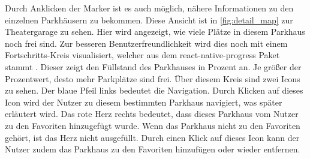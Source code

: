 Durch Anklicken der Marker ist es auch möglich, nähere Informationen zu den einzelnen Parkhäusern zu bekommen. Diese Ansicht ist in \autoref{fig:detail_map} zur Theatergarage zu sehen. Hier wird angezeigt, wie viele Plätze in diesem Parkhaus noch frei sind. Zur besseren Benutzerfreundlichkeit wird dies noch mit einem Fortschritts-Kreis visualisiert, welcher aus dem react-native-progress Paket stammt \cite{progress}. Dieser zeigt den Füllstand des Parkhauses in Prozent an. Je größer der Prozentwert, desto mehr Parkplätze sind frei. Über diesem Kreis sind zwei Icons zu sehen. Der blaue Pfeil links bedeutet die Navigation. Durch Klicken auf dieses Icon wird der Nutzer zu diesem bestimmten Parkhaus navigiert, was später erläutert wird. Das rote Herz rechts bedeutet, dass dieses Parkhaus vom Nutzer zu den Favoriten hinzugefügt wurde. Wenn das Parkhaus nicht zu den Favoriten gehört, ist das Herz nicht ausgefüllt. Durch einen Klick auf dieses Icon kann der Nutzer zudem das Parkhaus zu den Favoriten hinzufügen oder wieder entfernen.

